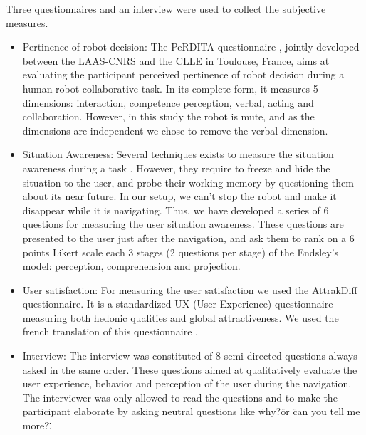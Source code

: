 \documentclass[a4paper,11pt,twoside]{StyleThese}
\begin{document}
Three questionnaires and an interview were used to collect the subjective measures. 
\begin{itemize}
\item Pertinence of robot decision: The PeRDITA questionnaire \cite{devin_evaluating_2018}, jointly developed between the LAAS-CNRS and the CLLE in Toulouse, France, aims at evaluating the participant perceived pertinence of robot decision during a human robot collaborative task. In its complete form, it measures 5 dimensions: interaction, competence perception, verbal, acting and collaboration. However, in this study the robot is mute, and as the dimensions are independent we chose to remove the verbal dimension.
\item Situation Awareness: Several techniques exists to measure the situation awareness during a task \cite{endsley_design_1988}. However, they require to freeze and hide the situation to the user, and probe their working memory by questioning them about its near future. In our setup, we can't stop the robot and make it disappear while it is navigating. Thus, we have developed a series of 6 questions for measuring the user situation awareness. These questions are presented to the user just after the navigation, and ask them to rank on a 6 points Likert scale each 3 stages (2 questions per stage) of the Endsley's model: perception, comprehension and projection.
\item User satisfaction: For measuring the user satisfaction we used the AttrakDiff questionnaire. It is a standardized UX (User Experience) questionnaire measuring both hedonic qualities and global attractiveness. We used the french translation of this questionnaire \cite{lallemand_creation_2015}.
\item Interview: The interview was constituted of 8 semi directed questions always asked in the same order. These questions aimed at qualitatively evaluate the user experience, behavior and perception of the user during the navigation. The interviewer was only allowed to read the questions and to make the participant elaborate by asking neutral questions like \"why?\" or \"can you tell me more?\".
\end{itemize}
\end{document}
